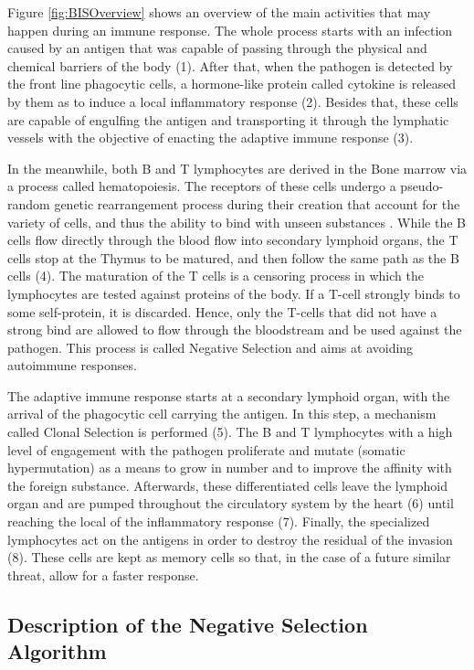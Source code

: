 Figure \ref{fig:BISOverview} shows an overview of the main activities that may happen during an immune response. The whole process starts with an infection caused by an antigen that was capable of passing through the physical and chemical barriers of the body (1). After that, when the pathogen is detected by the front line phagocytic cells, a hormone-like protein called cytokine is released by them as to induce a local inflammatory response (2). Besides that, these cells are capable of engulfing the antigen and transporting it through the lymphatic vessels with the objective of enacting the adaptive immune response (3).

In the meanwhile, both B and T lymphocytes are derived in the Bone marrow via a process called hematopoiesis. The receptors of these cells undergo a pseudo-random genetic rearrangement process during their creation that account for the variety of cells, and thus the ability to bind with unseen substances \cite{AIS2014}. While the B cells flow directly through the blood flow into secondary lymphoid organs, the T cells stop at the Thymus to be matured, and then follow the same path as the B cells (4). The maturation of the T cells is a censoring process in which the lymphocytes are tested against proteins of the body. If a T-cell strongly binds to some self-protein, it is discarded. Hence, only the T-cells that did not have a strong bind are allowed to flow through the bloodstream and be used against the pathogen. This process is called Negative Selection and aims at avoiding autoimmune responses.

The adaptive immune response starts at a secondary lymphoid organ, with the arrival of the phagocytic cell carrying the antigen. In this step, a mechanism called Clonal Selection is performed (5). The B and T lymphocytes with a high level of engagement with the pathogen proliferate and mutate (somatic hypermutation) as a means to grow in number and to improve the affinity with the foreign substance. Afterwards, these differentiated cells leave the lymphoid organ and are pumped throughout the circulatory system by the heart (6) until reaching the local of the inflammatory response (7). Finally, the specialized lymphocytes act on the antigens in order to destroy the residual of the invasion (8). These cells are kept as memory cells so that, in the case of a future similar threat, allow for a faster response. 

\subsection{Description of the Negative Selection Algorithm} \label{sec:bgNSA}

